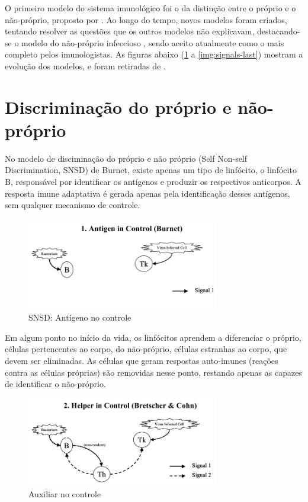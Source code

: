 O primeiro modelo do sistema imunológico foi o da distinção entre o próprio e o não-próprio, proposto por \citet{Burnet1959}. Ao longo do tempo, novos modelos foram criados, tentando resolver as questões que os outros modelos não explicavam, destacando-se o modelo do não-próprio infeccioso \cite{Janeway1989}, sendo aceito atualmente como o mais completo pelos imunologistas. As figuras abaixo (\ref{img:signals-first} a \ref{img:signals-last}) mostram a evolução dos modelos, e foram retiradas de \citet{Aickelin2002}.

\section{Discriminação do próprio e não-próprio}

No modelo de disciminação do próprio e não próprio (Self Non-self Discrimination, SNSD) de Burnet, existe apenas um tipo de linfócito, o linfócito B, responsável por identificar os antígenos e produzir os respectivos anticorpos. A resposta imune adaptativa é gerada apenas pela identificação desses antígenos, sem qualquer mecanismo de controle.

\begin{figure}[h!]
\centering
\includegraphics[width=0.75\textwidth]{img/signals1-antigen.png}
\caption{SNSD: Antígeno no controle}
\label{img:signals-first}
\end{figure}

Em algum ponto no início da vida, os linfócitos aprendem a diferenciar o próprio, células pertencentes ao corpo, do não-próprio, células estranhas ao corpo, que devem ser eliminadas. As células que geram respostas auto-imunes (reações contra as células próprias) são removidas nesse ponto, restando apenas as capazes de identificar o não-próprio.

\begin{figure}[h!]
\centering
\includegraphics[width=0.75\textwidth]{img/signals2-helper.png}
\caption{Auxiliar no controle}
\end{figure}

